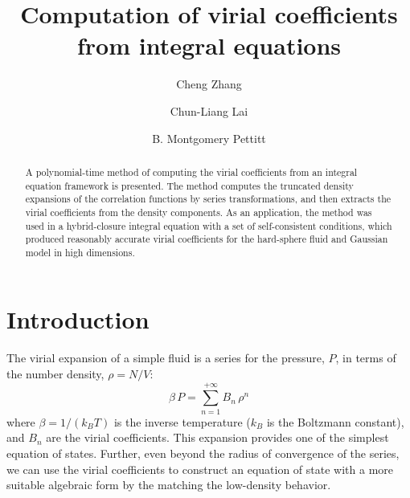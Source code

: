 \documentclass[aip,jcp,preprint,superscriptaddress,showpacs,preprintnumbers,amsmath,amssymb]{revtex4-1}
\begin{document}
\title{Computation of virial coefficients from integral equations}
\author{Cheng Zhang}
\author{Chun-Liang Lai}
\author{B. Montgomery Pettitt}



\begin{abstract}
A polynomial-time method of
computing the virial coefficients
from an integral equation framework
is presented.
%
The method computes the truncated density expansions
of the correlation functions by series transformations,
and then extracts the virial coefficients
from the density components.
%
As an application,
the method was used in a hybrid-closure integral equation
with a set of self-consistent conditions,
which produced reasonably accurate virial coefficients
for the hard-sphere fluid and Gaussian model
in high dimensions.
\end{abstract}



\maketitle





\section{Introduction}

The virial expansion\cite{
mayer, hill, *rice1965, uhlenbeck1962, hansen, mcquarrie}
of a simple fluid
is a series for the pressure, $P$,
in terms of the number density, $\rho = N/V$:
%
\begin{equation}
\beta \, P
=
\sum_{n = 1}^{+\infty} B_n \, \rho^n
\label{eq:virser}
\end{equation}
%
where $\beta = 1/(k_B T)$
is the inverse temperature
($k_B$ is the Boltzmann constant),
and $B_n$ are the virial coefficients.
%
This expansion provides one of the simplest equation of states.
%
Further,
even beyond the radius of convergence of the series,
we can use the virial coefficients
to construct an equation of state
with a more suitable algebraic form
by the matching the low-density behavior\cite{wheatley2013}.
\end{document}
